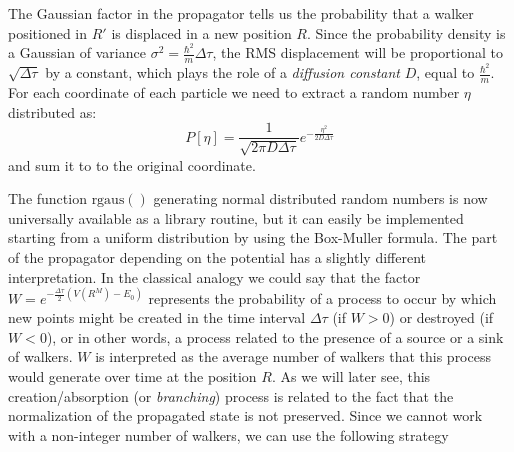 The Gaussian factor in the propagator tells us the probability that a walker positioned in $R'$ is displaced in a new position $R$. Since the probability density is a Gaussian of variance
$\sigma^2=\frac{\hbar^2}{m}\Delta\tau$, the RMS displacement will be proportional to $\sqrt{\Delta\tau}$ by a constant, which plays the role of a {\it diffusion constant} $D$, equal to $\frac{\hbar^2}{m}$. For each coordinate of each particle we need to extract a random number
$\eta$ distributed as:
\begin{equation}
P[\eta]=\frac{1}{\sqrt{2\pi D \Delta\tau}}e^{-\frac{\eta^2}{2D\Delta\tau}}
\end{equation}
and sum it to to the original coordinate. 
	\begin{algorithmic} 
		\EndFor
		\EndFor
	\end{algorithmic}
The function $\text{rgaus}()$ generating normal distributed random numbers is now universally available as a library routine, but it can easily be implemented starting from a uniform distribution by using the Box-Muller formula. 
The part of the propagator depending on the potential has a slightly different interpretation. In the classical analogy we could say that the factor $W=e^{-\frac{\Delta\tau}{2}(V(R^M)-E_0)}$ represents 
the probability of a process to occur by which new points might be created in the time interval $\Delta\tau$ (if $W>0$) or destroyed (if $W<0$), or in other words, a process related to the presence of a source or a sink of walkers. $W$ is interpreted as the average number of walkers that this
process would generate over time at the position $R$. As we will later see, this creation/absorption (or {\it branching}) process is related to the fact that the normalization of the propagated state is not preserved.
Since we cannot work with a non-integer number of walkers, we can use the following strategy
